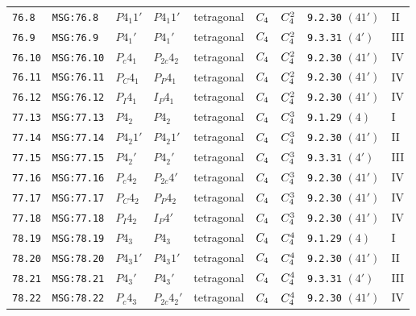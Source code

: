 \documentclass[fleqn,10pt]{jsarticle}
\begin{document}
\begin{center}
\begin{longtable}{lllllllll}
\texttt{76.8} & \texttt{MSG:76.8} & $P4_{1}1'$ & $P4_{1}1'$ & tetragonal & $C_{\rm 4}$ & $C_{\rm 4}^{2}$ & \texttt{9.2.30} $(41')$ & II \\
\texttt{76.9} & \texttt{MSG:76.9} & $P4_{1}'$ & $P4_{1}'$ & tetragonal & $C_{\rm 4}$ & $C_{\rm 4}^{2}$ & \texttt{9.3.31} $(4')$ & III \\
\texttt{76.10} & \texttt{MSG:76.10} & $P_{c}4_{1}$ & $P_{2c}4_{2}$ & tetragonal & $C_{\rm 4}$ & $C_{\rm 4}^{2}$ & \texttt{9.2.30} $(41')$ & IV \\
\texttt{76.11} & \texttt{MSG:76.11} & $P_{C}4_{1}$ & $P_{P}4_{1}$ & tetragonal & $C_{\rm 4}$ & $C_{\rm 4}^{2}$ & \texttt{9.2.30} $(41')$ & IV \\
\texttt{76.12} & \texttt{MSG:76.12} & $P_{I}4_{1}$ & $I_{P}4_{1}$ & tetragonal & $C_{\rm 4}$ & $C_{\rm 4}^{2}$ & \texttt{9.2.30} $(41')$ & IV \\ \hline
\texttt{77.13} & \texttt{MSG:77.13} & $P4_{2}$ & $P4_{2}$ & tetragonal & $C_{\rm 4}$ & $C_{\rm 4}^{3}$ & \texttt{9.1.29} $(4)$ & I \\
\texttt{77.14} & \texttt{MSG:77.14} & $P4_{2}1'$ & $P4_{2}1'$ & tetragonal & $C_{\rm 4}$ & $C_{\rm 4}^{3}$ & \texttt{9.2.30} $(41')$ & II \\
\texttt{77.15} & \texttt{MSG:77.15} & $P4_{2}'$ & $P4_{2}'$ & tetragonal & $C_{\rm 4}$ & $C_{\rm 4}^{3}$ & \texttt{9.3.31} $(4')$ & III \\
\texttt{77.16} & \texttt{MSG:77.16} & $P_{c}4_{2}$ & $P_{2c}4'$ & tetragonal & $C_{\rm 4}$ & $C_{\rm 4}^{3}$ & \texttt{9.2.30} $(41')$ & IV \\
\texttt{77.17} & \texttt{MSG:77.17} & $P_{C}4_{2}$ & $P_{P}4_{2}$ & tetragonal & $C_{\rm 4}$ & $C_{\rm 4}^{3}$ & \texttt{9.2.30} $(41')$ & IV \\
\texttt{77.18} & \texttt{MSG:77.18} & $P_{I}4_{2}$ & $I_{P}4'$ & tetragonal & $C_{\rm 4}$ & $C_{\rm 4}^{3}$ & \texttt{9.2.30} $(41')$ & IV \\ \hline
\texttt{78.19} & \texttt{MSG:78.19} & $P4_{3}$ & $P4_{3}$ & tetragonal & $C_{\rm 4}$ & $C_{\rm 4}^{4}$ & \texttt{9.1.29} $(4)$ & I \\
\texttt{78.20} & \texttt{MSG:78.20} & $P4_{3}1'$ & $P4_{3}1'$ & tetragonal & $C_{\rm 4}$ & $C_{\rm 4}^{4}$ & \texttt{9.2.30} $(41')$ & II \\
\texttt{78.21} & \texttt{MSG:78.21} & $P4_{3}'$ & $P4_{3}'$ & tetragonal & $C_{\rm 4}$ & $C_{\rm 4}^{4}$ & \texttt{9.3.31} $(4')$ & III \\
\texttt{78.22} & \texttt{MSG:78.22} & $P_{c}4_{3}$ & $P_{2c}4_{2}'$ & tetragonal & $C_{\rm 4}$ & $C_{\rm 4}^{4}$ & \texttt{9.2.30} $(41')$ & IV \\

\end{longtable}
\end{center}
\end{document}

